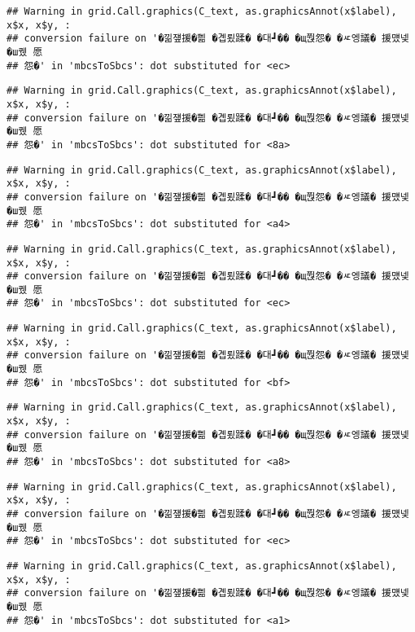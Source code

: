 \documentclass[
]{article}
\begin{document}
\begin{verbatim}
## Warning in grid.Call.graphics(C_text, as.graphicsAnnot(x$label), x$x, x$y, :
## conversion failure on '�낆쟾援�쁾 �곕룄蹂� �대┛�� �щ쭩怨� �ㅼ엥議� 援먰넻�ш퀬 愿
## 怨�' in 'mbcsToSbcs': dot substituted for <ec>
\end{verbatim}

\begin{verbatim}
## Warning in grid.Call.graphics(C_text, as.graphicsAnnot(x$label), x$x, x$y, :
## conversion failure on '�낆쟾援�쁾 �곕룄蹂� �대┛�� �щ쭩怨� �ㅼ엥議� 援먰넻�ш퀬 愿
## 怨�' in 'mbcsToSbcs': dot substituted for <8a>
\end{verbatim}

\begin{verbatim}
## Warning in grid.Call.graphics(C_text, as.graphicsAnnot(x$label), x$x, x$y, :
## conversion failure on '�낆쟾援�쁾 �곕룄蹂� �대┛�� �щ쭩怨� �ㅼ엥議� 援먰넻�ш퀬 愿
## 怨�' in 'mbcsToSbcs': dot substituted for <a4>
\end{verbatim}

\begin{verbatim}
## Warning in grid.Call.graphics(C_text, as.graphicsAnnot(x$label), x$x, x$y, :
## conversion failure on '�낆쟾援�쁾 �곕룄蹂� �대┛�� �щ쭩怨� �ㅼ엥議� 援먰넻�ш퀬 愿
## 怨�' in 'mbcsToSbcs': dot substituted for <ec>
\end{verbatim}

\begin{verbatim}
## Warning in grid.Call.graphics(C_text, as.graphicsAnnot(x$label), x$x, x$y, :
## conversion failure on '�낆쟾援�쁾 �곕룄蹂� �대┛�� �щ쭩怨� �ㅼ엥議� 援먰넻�ш퀬 愿
## 怨�' in 'mbcsToSbcs': dot substituted for <bf>
\end{verbatim}

\begin{verbatim}
## Warning in grid.Call.graphics(C_text, as.graphicsAnnot(x$label), x$x, x$y, :
## conversion failure on '�낆쟾援�쁾 �곕룄蹂� �대┛�� �щ쭩怨� �ㅼ엥議� 援먰넻�ш퀬 愿
## 怨�' in 'mbcsToSbcs': dot substituted for <a8>
\end{verbatim}

\begin{verbatim}
## Warning in grid.Call.graphics(C_text, as.graphicsAnnot(x$label), x$x, x$y, :
## conversion failure on '�낆쟾援�쁾 �곕룄蹂� �대┛�� �щ쭩怨� �ㅼ엥議� 援먰넻�ш퀬 愿
## 怨�' in 'mbcsToSbcs': dot substituted for <ec>
\end{verbatim}

\begin{verbatim}
## Warning in grid.Call.graphics(C_text, as.graphicsAnnot(x$label), x$x, x$y, :
## conversion failure on '�낆쟾援�쁾 �곕룄蹂� �대┛�� �щ쭩怨� �ㅼ엥議� 援먰넻�ш퀬 愿
## 怨�' in 'mbcsToSbcs': dot substituted for <a1>
\end{verbatim}
\end{document}
